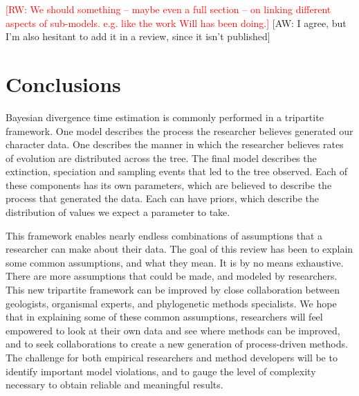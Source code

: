 \documentclass[11pt]{article}
\newcommand{\rw}[1]{{\textcolor{red}{[RW: #1]}}} %
\newcommand{\aw}[1]{{\textcolor{armygreen}{[AW: #1]}}} %
\begin{document}
\rw{We should something -- maybe even a full section -- on linking different aspects of sub-models. e.g. like the work Will has been doing.} \aw{I agree, but I'm also hesitant to add it in a review, since it isn't published}

\section{Conclusions}

Bayesian divergence time estimation is commonly performed in a tripartite framework.
One model describes the process the researcher believes generated our character data.
One describes the manner in which the researcher believes rates of evolution are distributed across the tree.
The final model describes the extinction, speciation and sampling events that led to the tree observed.
Each of these components has its own parameters, which are believed to describe the process that generated the data.
Each can have priors, which describe the distribution of values we expect a parameter to take.


This framework enables nearly endless combinations of assumptions that a researcher can make about their data.
The goal of this review has been to explain some common assumptions, and what they mean. 
It is by no means exhaustive.
There are more assumptions that could be made, and modeled by researchers.
This new tripartite framework can be improved by close collaboration between geologists, organismal experts, and phylogenetic methods specialists. 
We hope that in explaining some of these common assumptions, researchers will feel empowered to look at their own data and see where methods can be improved, and to seek collaborations to create a new generation of process-driven methods. The challenge for both empirical researchers and method developers will be to identify important model violations, and to gauge the level of complexity necessary to obtain reliable and meaningful results.

\end{document}
